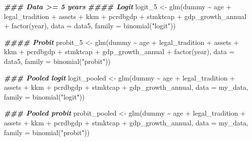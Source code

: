 \documentclass[a4paper,nobind]{templates/ociamthesis}
\newenvironment{Shaded}{\begin{snugshade}}{\end{snugshade}}
\newcommand{\AttributeTok}[1]{\textcolor[rgb]{0.77,0.63,0.00}{#1}}
\newcommand{\DocumentationTok}[1]{\textcolor[rgb]{0.56,0.35,0.01}{\textbf{\textit{#1}}}}
\newcommand{\FunctionTok}[1]{\textcolor[rgb]{0.00,0.00,0.00}{#1}}
\newcommand{\NormalTok}[1]{#1}
\newcommand{\OtherTok}[1]{\textcolor[rgb]{0.56,0.35,0.01}{#1}}
\newcommand{\SpecialCharTok}[1]{\textcolor[rgb]{0.00,0.00,0.00}{#1}}
\newcommand{\StringTok}[1]{\textcolor[rgb]{0.31,0.60,0.02}{#1}}
\renewenvironment{Shaded}
{
  \vspace{10pt}%
  \begin{snugshade}%
}{%
  \end{snugshade}%
  \vspace{8pt}%
}
\begin{document}
\begin{Shaded}
\begin{Highlighting}[]
\DocumentationTok{\#\#\# Data \textgreater{}= 5 years}
\DocumentationTok{\#\#\#\# Logit}
\NormalTok{logit\_5 }\OtherTok{\textless{}{-}} \FunctionTok{glm}\NormalTok{(dummy }\SpecialCharTok{\textasciitilde{}}\NormalTok{ age }\SpecialCharTok{+}\NormalTok{ legal\_tradition }\SpecialCharTok{+} 
\NormalTok{       assets }\SpecialCharTok{+}\NormalTok{ kkm }\SpecialCharTok{+} 
\NormalTok{       pcrdbgdp }\SpecialCharTok{+}\NormalTok{ stmktcap }\SpecialCharTok{+}\NormalTok{ gdp\_growth\_annual }\SpecialCharTok{+} 
       \FunctionTok{factor}\NormalTok{(year), }\AttributeTok{data =}\NormalTok{ data5, }
       \AttributeTok{family =} \FunctionTok{binomial}\NormalTok{(}\StringTok{"logit"}\NormalTok{))}

\DocumentationTok{\#\#\#\# Probit}
\NormalTok{probit\_5 }\OtherTok{\textless{}{-}} \FunctionTok{glm}\NormalTok{(dummy }\SpecialCharTok{\textasciitilde{}}\NormalTok{ age }\SpecialCharTok{+}\NormalTok{ legal\_tradition }\SpecialCharTok{+} 
\NormalTok{       assets }\SpecialCharTok{+}\NormalTok{ kkm }\SpecialCharTok{+} 
\NormalTok{       pcrdbgdp }\SpecialCharTok{+}\NormalTok{ stmktcap }\SpecialCharTok{+}\NormalTok{ gdp\_growth\_annual }\SpecialCharTok{+} 
       \FunctionTok{factor}\NormalTok{(year), }\AttributeTok{data =}\NormalTok{ data5,}
       \AttributeTok{family =} \FunctionTok{binomial}\NormalTok{(}\StringTok{"probit"}\NormalTok{))}

\DocumentationTok{\#\#\# Pooled logit}
\NormalTok{logit\_pooled }\OtherTok{\textless{}{-}} \FunctionTok{glm}\NormalTok{(dummy }\SpecialCharTok{\textasciitilde{}}\NormalTok{ age }\SpecialCharTok{+}\NormalTok{ legal\_tradition }\SpecialCharTok{+} 
\NormalTok{       assets }\SpecialCharTok{+}\NormalTok{ kkm }\SpecialCharTok{+} 
\NormalTok{       pcrdbgdp }\SpecialCharTok{+}\NormalTok{ stmktcap }\SpecialCharTok{+}\NormalTok{ gdp\_growth\_annual, }
       \AttributeTok{data =}\NormalTok{ my\_data, }\AttributeTok{family =} \FunctionTok{binomial}\NormalTok{(}\StringTok{"logit"}\NormalTok{))}

\DocumentationTok{\#\#\# Pooled probit}
\NormalTok{probit\_pooled }\OtherTok{\textless{}{-}} \FunctionTok{glm}\NormalTok{(dummy }\SpecialCharTok{\textasciitilde{}}\NormalTok{ age }\SpecialCharTok{+}\NormalTok{ legal\_tradition }\SpecialCharTok{+} 
\NormalTok{       assets }\SpecialCharTok{+}\NormalTok{ kkm }\SpecialCharTok{+} 
\NormalTok{       pcrdbgdp }\SpecialCharTok{+}\NormalTok{ stmktcap }\SpecialCharTok{+}\NormalTok{ gdp\_growth\_annual, }
       \AttributeTok{data =}\NormalTok{ my\_data, }\AttributeTok{family =} \FunctionTok{binomial}\NormalTok{(}\StringTok{"probit"}\NormalTok{))}
\end{Highlighting}
\end{Shaded}
\end{document}

